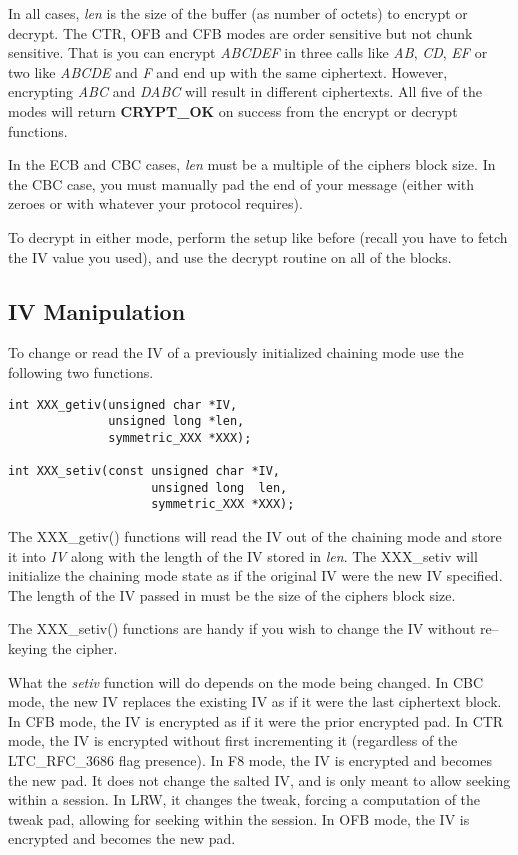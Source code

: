 \documentclass[synpaper]{book}
\begin{document}
In all cases, \textit{len} is the size of the buffer (as number of octets) to encrypt or decrypt.  The CTR, OFB and CFB modes are order sensitive but not
chunk sensitive.  That is you can encrypt \textit{ABCDEF} in three calls like \textit{AB}, \textit{CD}, \textit{EF} or two like \textit{ABCDE} and \textit{F}
and end up with the same ciphertext.  However, encrypting \textit{ABC} and \textit{DABC} will result in different ciphertexts.  All
five of the modes will return {\bf CRYPT\_OK} on success from the encrypt or decrypt functions.

In the ECB and CBC cases, \textit{len} must be a multiple of the ciphers block size.  In the CBC case, you must manually pad the end of your message (either with
zeroes or with whatever your protocol requires).

To decrypt in either mode, perform the setup like before (recall you have to fetch the IV value you used), and use the decrypt routine on all of the blocks.

\subsection{IV Manipulation}
To change or read the IV of a previously initialized chaining mode use the following two functions.
     
 
\begin{verbatim}
int XXX_getiv(unsigned char *IV,
              unsigned long *len,
              symmetric_XXX *XXX);

int XXX_setiv(const unsigned char *IV,
                    unsigned long  len,
                    symmetric_XXX *XXX);
\end{verbatim}

The XXX\_getiv() functions will read the IV out of the chaining mode and store it into \textit{IV} along with the length of the IV
stored in \textit{len}.  The XXX\_setiv will initialize the chaining mode state as if the original IV were the new IV specified.  The length
of the IV passed in must be the size of the ciphers block size.

The XXX\_setiv() functions are handy if you wish to change the IV without re--keying the cipher.

What the \textit{setiv} function will do depends on the mode being changed.  In CBC mode, the new IV replaces the existing IV as if it
were the last ciphertext block.  In CFB mode, the IV is encrypted as if it were the prior encrypted pad.  In CTR mode, the IV is encrypted without
first incrementing it (regardless of the LTC\_RFC\_3686 flag presence).  In F8 mode, the IV is encrypted and becomes the new pad.  It does not change
the salted IV, and is only meant to allow seeking within a session.  In LRW, it changes the tweak, forcing a computation of the tweak pad, allowing for
seeking within the session.  In OFB mode, the IV is encrypted and becomes the new pad.
\end{document}
